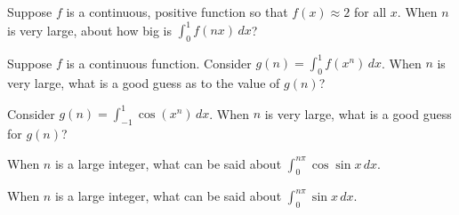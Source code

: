 \documentclass{ximera}
\newcommand{\recommendation}[1]{}
\begin{document}
\begin{problem}
  Suppose $f$ is a continuous, positive function so that $f(x) \approx 2$ for all $x$.  When $n$ is very large, about how big is $\int_0^1 f(nx) \, dx$?
  \begin{multipleChoice}
   \end{multipleChoice}
\end{problem}

\begin{problem}
  Suppose $f$ is a continuous function.  Consider $g(n) = \int_0^1 f(x^n) \, dx$.  When $n$ is very large, what is a good guess as to the value of $g(n)$?
  \begin{multipleChoice}
  \end{multipleChoice}
\end{problem}

\begin{problem}
  Consider $g(n) = \int_{-1}^1 \cos(x^n) \, dx$.  When $n$ is very large, what is a good guess for $g(n)$?
  \begin{multipleChoice}
  \end{multipleChoice}
\end{problem}

\begin{problem}
  When $n$ is a large integer, what can be said about $\int_0^{n \pi} \cos \sin x \, dx$.
  \begin{multipleChoice}
  \end{multipleChoice}
\end{problem}

\begin{problem}
  When $n$ is a large integer, what can be said about $\int_0^{n \pi} \sin x \, dx$.
  \begin{multipleChoice}
  \end{multipleChoice}
\end{problem}
\end{document}
